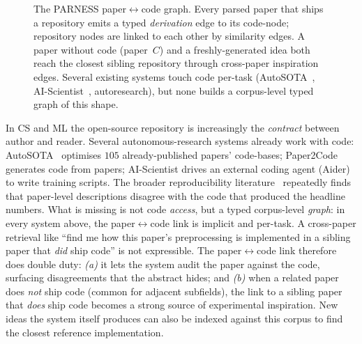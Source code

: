 \documentclass{article}
\newcommand{\parness}{\textsf{PARNESS}}
\begin{document}
\begin{figure}[t]
\caption{The \parness{} paper$\leftrightarrow$code graph. Every parsed
paper that ships a repository emits a typed \emph{derivation} edge to
its code-node; repository nodes are linked to each other by similarity
edges. A paper without code (paper~$C$) and a freshly-generated idea
both reach the closest sibling repository through cross-paper
inspiration edges. Several existing systems touch code per-task
(AutoSOTA~\cite{autosota}, AI-Scientist~\cite{aisciv1,aisciv2},
autoresearch), but none builds a corpus-level typed graph of this
shape.}
\label{fig:codelink}
\end{figure}

In CS and ML the open-source repository is increasingly the
\emph{contract} between author and reader. Several autonomous-research
systems already work with code: AutoSOTA~\cite{autosota} optimises
$105$ already-published papers' code-bases; Paper2Code~\cite{paper2code}
generates code from papers; AI-Scientist drives an external coding
agent (Aider) to write training scripts. The broader reproducibility
literature~\cite{leakageml,seereprod} repeatedly finds that paper-level
descriptions disagree with the code that produced the headline numbers.
What is missing is not code \emph{access}, but a typed corpus-level
\emph{graph}: in every system above, the paper$\leftrightarrow$code link
is implicit and per-task. A cross-paper retrieval like ``find me how
this paper's preprocessing is implemented in a sibling paper that
\emph{did} ship code'' is not expressible. The paper$\leftrightarrow$code
link therefore does double duty: \emph{(a)} it lets the system audit
the paper against the code, surfacing disagreements that the abstract
hides; and \emph{(b)} when a related paper does \emph{not} ship code
(common for adjacent subfields), the link to a sibling paper that
\emph{does} ship code becomes a strong source of experimental
inspiration. New ideas the system itself produces can also be indexed
against this corpus to find the closest reference implementation.
\end{document}
